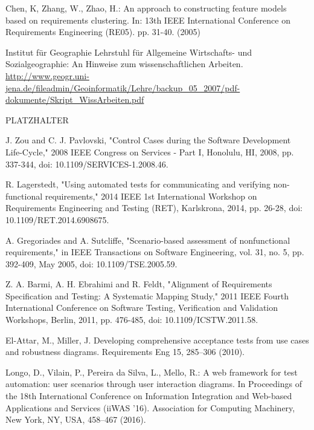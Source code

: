 \documentclass[a4paper,10pt, bibliography=totocnumbered]{scrreprt}
\begin{document}
\begin{thebibliography}{9}

 Chen, K, Zhang, W., Zhao, H.: An approach to constructing feature models based on requirements clustering.
In: 13th IEEE International Conference on Requirements Engineering (RE05). pp. 31-40. (2005)

 Institut für Geographie   
Lehrstuhl für Allgemeine Wirtschafts- und Sozialgeographie: An Hinweise zum wissenschaftlichen Arbeiten.
\url{http://www.geogr.uni-jena.de/fileadmin/Geoinformatik/Lehre/backup_05_2007/pdf-dokumente/Skript_WissArbeiten.pdf}

 PLATZHALTER

 J. Zou and C. J. Pavlovski, "Control Cases during the Software Development Life-Cycle," 2008 IEEE Congress on Services - Part I, Honolulu, HI, 2008, pp. 337-344, doi: 10.1109/SERVICES-1.2008.46.

 R. Lagerstedt, "Using automated tests for communicating and verifying non-functional requirements," 2014 IEEE 1st International Workshop on Requirements Engineering and Testing (RET), Karlskrona, 2014, pp. 26-28, doi: 10.1109/RET.2014.6908675.

 A. Gregoriades and A. Sutcliffe, "Scenario-based assessment of nonfunctional requirements," in IEEE Transactions on Software Engineering, vol. 31, no. 5, pp. 392-409, May 2005, doi: 10.1109/TSE.2005.59.

 Z. A. Barmi, A. H. Ebrahimi and R. Feldt, "Alignment of Requirements Specification and Testing: A Systematic Mapping Study," 2011 IEEE Fourth International Conference on Software Testing, Verification and Validation Workshops, Berlin, 2011, pp. 476-485, doi: 10.1109/ICSTW.2011.58.

 El-Attar, M., Miller, J. Developing comprehensive acceptance tests from use cases and robustness diagrams. Requirements Eng 15, 285–306 (2010).

 Longo, D., Vilain, P., Pereira da Silva, L., Mello, R.: A web framework for test automation: user scenarios through user interaction diagrams. In Proceedings of the 18th International Conference on Information Integration and Web-based Applications and Services (iiWAS '16). Association for Computing Machinery, New York, NY, USA, 458–467 (2016). 


\end{thebibliography}
\end{document}
